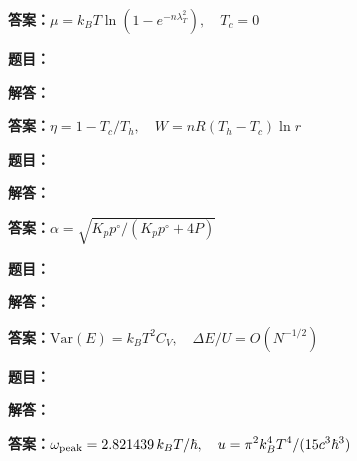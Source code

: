 \documentclass[lang=cn,color=blue,11pt]{elegantbook}
\begin{document}
\par\noindent\textbf{答案：}\(\displaystyle \mu=k_BT\ln(1-e^{-n\lambda_T^2}),\quad T_c=0\)\par
\par\smallskip\noindent\hrulefill\par\medskip
{}\par
\noindent\textbf{题目：}
\par\noindent\textbf{解答：}
\par\noindent\textbf{答案：}\(\displaystyle \eta=1-T_c/T_h,\quad W=nR(T_h-T_c)\ln r\)\par
\par\smallskip\noindent\hrulefill\par\medskip
{}\par
\noindent\textbf{题目：}
\par\noindent\textbf{解答：}
\par\noindent\textbf{答案：}\(\displaystyle \alpha=\sqrt{K_pp^\circ/(K_pp^\circ+4P)}\)\par
\par\smallskip\noindent\hrulefill\par\medskip
{}\par
\noindent\textbf{题目：}
\par\noindent\textbf{解答：}
\par\noindent\textbf{答案：}\(\displaystyle \mathrm{Var}(E)=k_BT^2C_V,\quad \Delta E/U=O(N^{-1/2})\)\par
\par\smallskip\noindent\hrulefill\par\medskip
{}\par
\noindent\textbf{题目：}
\par\noindent\textbf{解答：}
\par\noindent\textbf{答案：}\(\displaystyle \omega_{\rm peak}=2.821439\,k_BT/\hbar,\quad u=\pi^2k_B^4T^4/(15c^3\hbar^3)\)\par
\end{document}
